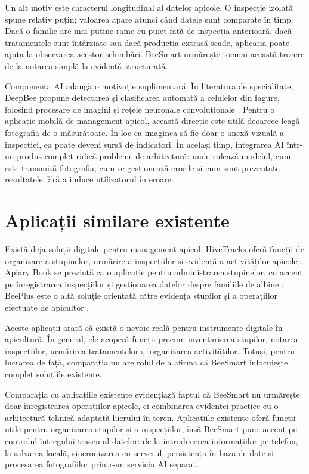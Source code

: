 Un alt motiv este caracterul longitudinal al datelor apicole. O inspecție izolată spune relativ puțin; valoarea apare atunci când datele sunt comparate în timp. Dacă o familie are mai puține rame cu puiet față de inspecția anterioară, dacă tratamentele sunt întârziate sau dacă producția extrasă scade, aplicația poate ajuta la observarea acestor schimbări. BeeSmart urmărește tocmai această trecere de la notarea simplă la evidență structurată.

Componenta AI adaugă o motivație suplimentară. În literatura de specialitate, DeepBee propune detectarea și clasificarea automată a celulelor din fagure, folosind procesare de imagini și rețele neuronale convoluționale \cite{deepbeeArticle}. Pentru o aplicație mobilă de management apicol, această direcție este utilă deoarece leagă fotografia de o măsurătoare. În loc ca imaginea să fie doar o anexă vizuală a inspecției, ea poate deveni sursă de indicatori. În același timp, integrarea AI într-un produs complet ridică probleme de arhitectură: unde rulează modelul, cum este transmisă fotografia, cum se gestionează erorile și cum sunt prezentate rezultatele fără a induce utilizatorul în eroare.

\section{Aplicații similare existente}

Există deja soluții digitale pentru management apicol. HiveTracks oferă funcții de organizare a stupinelor, urmărire a inspecțiilor și evidență a activităților apicole \cite{hivetracks}. Apiary Book se prezintă ca o aplicație pentru administrarea stupinelor, cu accent pe înregistrarea inspecțiilor și gestionarea datelor despre familiile de albine \cite{apiaryBook}. BeePlus este o altă soluție orientată către evidența stupilor și a operațiilor efectuate de apicultor \cite{beeplus}.

Aceste aplicații arată că există o nevoie reală pentru instrumente digitale în apicultură. În general, ele acoperă funcții precum inventarierea stupilor, notarea inspecțiilor, urmărirea tratamentelor și organizarea activităților. Totuși, pentru lucrarea de față, comparația nu are rolul de a afirma că BeeSmart înlocuiește complet soluțiile existente. 

Comparația cu aplicațiile existente evidențiază faptul că BeeSmart nu urmărește doar înregistrarea operațiilor apicole, ci combinarea evidenței practice cu o arhitectură tehnică adaptată lucrului în teren. Aplicațiile existente oferă funcții utile pentru organizarea stupilor și a inspecțiilor, însă BeeSmart pune accent pe controlul întregului traseu al datelor: de la introducerea informațiilor pe telefon, la salvarea locală, sincronizarea cu serverul, persistența în baza de date și procesarea fotografiilor printr-un serviciu AI separat.

